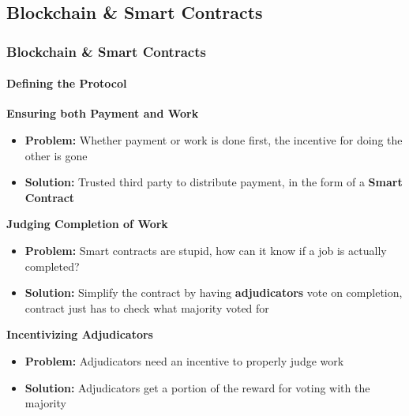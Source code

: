 \documentclass[
	10pt, %
	aspectratio=169, %
]{beamer}
\begin{document}
\subsection{Blockchain \& Smart Contracts}
\begin{frame}
	\frametitle{Blockchain \& Smart Contracts}
	\framesubtitle{Defining the Protocol}

	{
		\large \bf
		Ensuring both Payment and Work
	}
	\begin{itemize}
		\item \textbf{Problem:} Whether payment or work is done first, the incentive for doing the other is gone
		\item \textbf{Solution:} Trusted third party to distribute payment, in the form of a \textbf{Smart Contract}
	\end{itemize}

	\medskip

	{
		\large \bf
		Judging Completion of Work
	}
	\begin{itemize}
		\item \textbf{Problem:} Smart contracts are stupid, how can it know if a job is actually completed?
		\item \textbf{Solution:} Simplify the contract by having \textbf{adjudicators} vote on completion, contract just has to check what majority voted for
	\end{itemize}

	\medskip

	{
		\large \bf
		Incentivizing Adjudicators
	}
	\begin{itemize}
		\item \textbf{Problem:} Adjudicators need an incentive to properly judge work
		\item \textbf{Solution:} Adjudicators get a portion of the reward for voting with the majority
	\end{itemize}
\end{frame}
\end{document}
